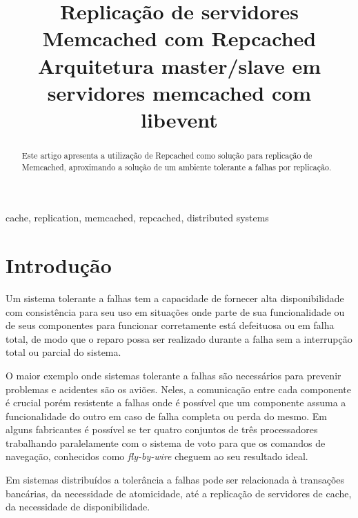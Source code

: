 \documentclass[conference]{IEEEtran}
\begin{document}
\title{Replicação de servidores Memcached com Repcached\\
{\footnotesize Arquitetura master/slave em servidores memcached com libevent}
}


\author{
}

\maketitle

\begin{abstract}
Este artigo apresenta a utilização de Repcached como solução para replicação de Memcached, aproximando a solução de um ambiente tolerante a falhas por replicação.
\end{abstract}

\begin{IEEEkeywords}
cache, replication, memcached, repcached, distributed systems
\end{IEEEkeywords}

\section{Introdução}

Um sistema tolerante a falhas tem a capacidade de fornecer alta disponibilidade com consistência para seu uso em situações onde parte de sua funcionalidade ou de seus componentes para funcionar corretamente está defeituosa ou em falha total, de modo que o reparo possa ser realizado durante a falha sem a interrupção total ou parcial do sistema. \cite{Tanenbaum:2006:DSP:1202502}

O maior exemplo onde sistemas tolerante a falhas são necessários para prevenir problemas e acidentes são os aviões. Neles, a comunicação entre cada componente é crucial porém resistente a falhas onde é possível que um componente assuma a funcionalidade do outro em caso de falha completa ou perda do mesmo. Em alguns fabricantes é possível se ter quatro conjuntos de três processadores trabalhando paralelamente com o sistema de voto para que os comandos de navegação, conhecidos como \textit{fly-by-wire} cheguem ao seu resultado ideal. \cite{herman}

Em sistemas distribuídos a tolerância a falhas pode ser relacionada à transações bancárias, da necessidade de atomicidade, até a replicação de servidores de cache, da necessidade de disponibilidade. 
\end{document}
